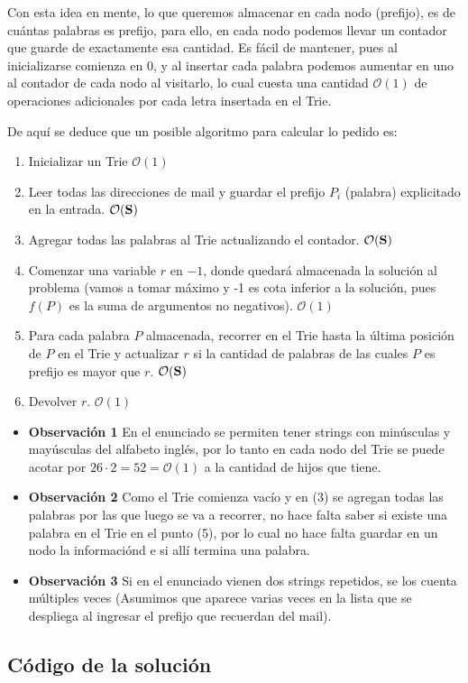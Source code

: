 	Con esta idea en mente, lo que queremos almacenar en cada nodo (prefijo), es de cuántas palabras es prefijo, para ello, en cada nodo podemos llevar un contador que guarde de exactamente esa cantidad. Es fácil de mantener, pues al inicializarse comienza en $0$, y al insertar cada palabra podemos aumentar en uno al contador de cada nodo al visitarlo, lo cual cuesta una cantidad $\mathcal{O}(1)$ de operaciones adicionales por cada letra insertada en el Trie.
	
	De aquí se deduce que un posible algoritmo para calcular lo pedido es:
	
\begin{enumerate}
	\item Inicializar un Trie $\mathcal{O}(1)$
	\item Leer todas las direcciones de mail y guardar el prefijo $P_i$ (palabra) explicitado en la entrada. $\mathcal{O}(\bf S)$ 
	\item Agregar todas las palabras al Trie actualizando el contador. $\mathcal{O}(\bf S)$ 
	\item Comenzar una variable $r$ en $-1$, donde quedará almacenada la solución al problema (vamos a tomar máximo y -1 es cota inferior a la solución, pues $f(P)$ es la suma de argumentos no negativos). $\mathcal{O}(1)$
	\item Para cada palabra $P$ almacenada, recorrer en el Trie hasta la última posición de $P$ en el Trie y actualizar $r$ si la cantidad de palabras de las cuales $P$ es prefijo es mayor que $r$. $\mathcal{O}(\bf S)$
	\item Devolver $r$. $\mathcal{O}(1)$
\end{enumerate}

\begin{itemize}
	\item \textbf{Observación 1} En el enunciado se permiten tener strings con minúsculas y mayúsculas del alfabeto inglés, por lo tanto en cada nodo del Trie se puede acotar por $26 \cdot 2 = 52 = \mathcal{O}(1)$ a la cantidad de hijos que tiene.
	\item \textbf{Observación 2} Como el Trie comienza vacío y en (3) se agregan todas las palabras por las que luego se va a recorrer, no hace falta saber si existe una palabra en el Trie en el punto (5), por lo cual no hace falta guardar en un nodo la informaciónd e si allí termina una palabra.
	\item \textbf{Observación 3} Si en el enunciado vienen dos strings repetidos, se los cuenta múltiples veces (Asumimos que aparece varias veces en la lista que se despliega al ingresar el prefijo que recuerdan del mail).  
\end{itemize}

\newpage
\subsection{Código de la solución}
\lstset{inputencoding=utf8/latin1}

